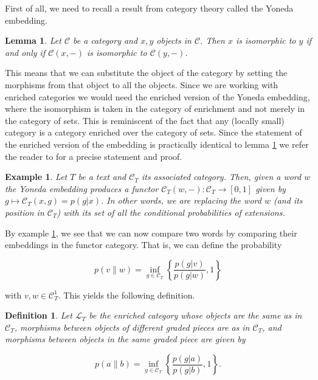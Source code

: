 \documentclass[10pt,a4paper]{elsarticle}
\newcommand{\C}{\mathcal{C}}
\renewcommand{\L}{\mathcal{L}}
\newtheorem{lemma}[theorem]{Lemma}
\newtheorem{exa}[theorem]{Example}
\newtheorem{definition}[theorem]{Definition}
\begin{document}
First of all, we need to recall a result from category theory called the Yoneda embedding.

\begin{lemma}\label{lem:yoneda}
	Let $\mathcal{C}$ be a category and $x,y$ objects in $\mathcal{C}$. Then $x$ is isomorphic to $y$ if and only if $\C(x,-)$ is isomorphic to $\C(y,-)$.
\end{lemma}

This means that we can substitute the object of the category by setting the morphisms from that object to all the objects. Since we are working with enriched categories we would need the enriched version of the Yoneda embedding, where the isomorphism is taken in the category of enrichment and not merely in the category of sets. This is reminiscent of the fact that any (locally small) category is a category enriched over the category of sets. Since the statement of the enriched version of the embedding is practically identical to lemma \ref{lem:yoneda} we refer the reader to \cite[Section 2.4]{kelly1982basic} for a precise statement and proof.

\begin{exa}\label{exa:YE}
	Let $T$ be a text and $\C_{T}$ its associated category. Then, given a word $w$ the Yoneda embedding produces a functor $\C_{T}(w,-)\colon \C_{T}\to [0,1]$ given by $g\mapsto \C_{T}(x,g)=p(g|x)$. 	In other words, we are replacing the word $w$ (and its position in $\C_{T}$) with its set of all the conditional probabilities of extensions.
\end{exa}

By example \ref{exa:YE}, we see that we can now compare two words by comparing their embeddings in the functor category. That is, we can define the probability 

\begin{equation}\label{eq:endoL}
	p(v\| w)=\inf_{g\in\C_{T}}\left\{\frac{p(g|v)}{p(g|w)},1\right\}
\end{equation}

with $v,w\in \C_{T}^{1}$. This yields the following definition.

\begin{definition}
	
	Let $\L_{T}$ be the enriched category whose objects are the same as in $\C_{T}$, morphisms between objects of different graded pieces are as in $\C_{T}$, and morphisms between objects in the same graded piece are given by
	
	\begin{equation*}\label{eq:samemorphism}
		p(a\| b)=\inf_{g\in\C_{T}}\left\{\frac{p(g|a)}{p(g|b)},1\right\}.
	\end{equation*}
\end{definition}
\end{document}
